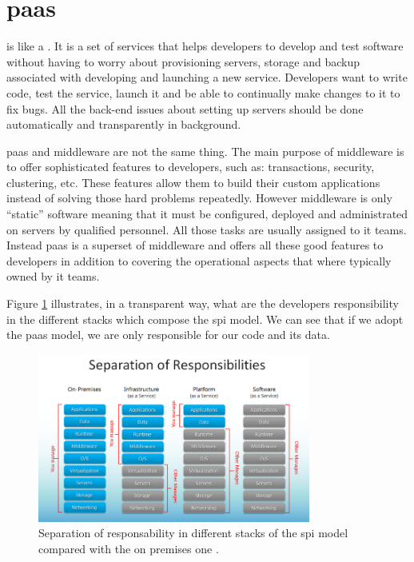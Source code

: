 %
%
\section{\acf{paas}}
\label{sec:problemSpace-paas}
 is like a . It is a set of services that helps developers
to develop and test software without having to worry about provisioning servers, storage and backup
associated with developing and launching a new service. Developers want to write code, test the service,
launch it and be able to continually make changes to it to fix bugs. All the back-end issues about setting
up servers should be done automatically and transparently in background.

\ac{paas} and middleware are not the same thing. The main purpose of middleware is to offer
sophisticated features to developers, such as: transactions, security, clustering, etc. These features
allow them to build their custom applications instead of solving those hard problems repeatedly.
However middleware is only ``static'' software meaning that it must be configured, deployed and
administrated on servers by qualified personnel. All those tasks are usually assigned to \acs{it} teams.
Instead \ac{paas} is a superset of middleware and offers all these good features to developers
in addition to covering the operational aspects that where typically owned by \acs{it} teams.

Figure \ref{img:problemSpace-paas-spiResponsibilities} illustrates, in a transparent way, what are the
developers responsibility in the different stacks which compose the \ac{spi} model. We can see that
if we adopt the \ac{paas} model, we are only responsible for our code and its data.

\begin{figure}
	\centering{}
	\includegraphics[width=0.8\textwidth]{chapters/problem/images/separation-responsabilities.png}
	\caption[Separation of responsability in \acs{spi}]{Separation of responsability in different stacks
		of the \acf{spi} model compared with the on premises one \cite{spiRepsonabilities}.}
	\label{img:problemSpace-paas-spiResponsibilities}
\end{figure}

